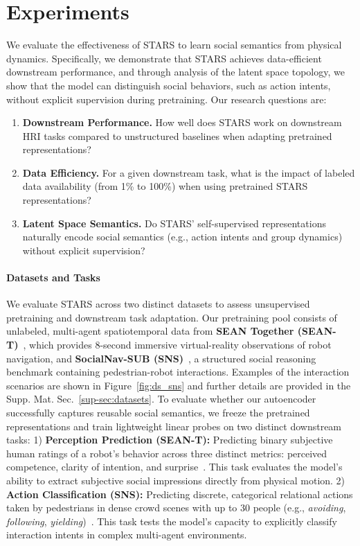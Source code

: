 \documentclass{article}
\newcommand{\method}{STARS\xspace}
\begin{document}
\section{Experiments}
\label{sec:experiments}

We evaluate the effectiveness of \method to learn social semantics from physical dynamics.
Specifically, we demonstrate that \method achieves data-efficient downstream performance, and through analysis of the latent space topology, we show that the model can distinguish social behaviors, such as action intents, without explicit supervision during pretraining.
Our research questions are:

\begin{enumerate}[nosep, label={\textbf{RQ\arabic*:}}, leftmargin=*]
    \item \textbf{Downstream Performance.} How well does \method work on downstream HRI tasks compared to unstructured baselines when adapting pretrained representations?
    \item \textbf{Data Efficiency.} For a given downstream task, what is the impact of labeled data availability (from 1\% to 100\%) when using pretrained \method representations?
    \item \textbf{Latent Space Semantics.} Do \method' self-supervised representations naturally encode social semantics (e.g., action intents and group dynamics) without explicit supervision?
\end{enumerate}


\paragraph{Datasets and Tasks}
We evaluate \method across two distinct datasets to assess unsupervised pretraining and downstream task adaptation.
Our pretraining pool consists of unlabeled, multi-agent spatiotemporal data from \textbf{SEAN Together (SEAN-T)}~\cite{zhang2023predicting}, which provides 8-second immersive virtual-reality observations of robot navigation, and \textbf{SocialNav-SUB (SNS)}~\cite{munje2025socialnavsub}, a structured social reasoning benchmark containing pedestrian-robot interactions.
Examples of the interaction scenarios are shown in Figure~\ref{fig:ds_sns} and further details are provided in the Supp. Mat. Sec.~\ref{sup-sec:datasets}.
%
To evaluate whether our autoencoder successfully captures reusable social semantics, we freeze the pretrained representations and train lightweight linear probes on two distinct downstream tasks: 
%
1) \textbf{Perception Prediction (SEAN-T):} Predicting binary subjective human ratings of a robot's behavior across three distinct metrics: perceived competence, clarity of intention, and surprise~\cite{zhang2023predicting}. This task evaluates the model's ability to extract subjective social impressions directly from physical motion.
2) \textbf{Action Classification (SNS):} Predicting discrete, categorical relational actions taken by pedestrians in dense crowd scenes with up to 30 people (e.g., \emph{avoiding}, \emph{following}, \emph{yielding})~\cite{munje2025socialnavsub}. This task tests the model's capacity to explicitly classify interaction intents in complex multi-agent environments.
\end{document}
